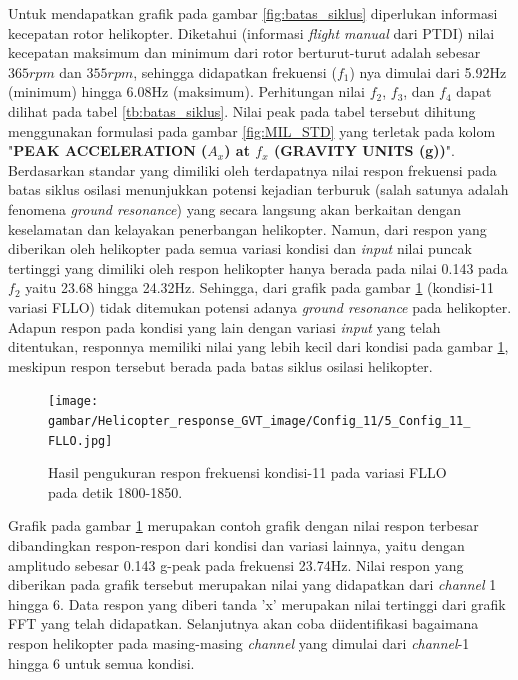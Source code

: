 Untuk mendapatkan grafik pada gambar \ref{fig:batas_siklus} diperlukan informasi kecepatan rotor helikopter. Diketahui (informasi \textit{flight manual} dari PTDI) nilai kecepatan maksimum dan minimum dari rotor berturut-turut adalah sebesar $365 rpm$ dan $355 rpm$, sehingga didapatkan frekuensi ($f_1$) nya dimulai dari 5.92Hz (minimum) hingga 6.08Hz (maksimum). Perhitungan nilai $f_2$, $f_3$, dan $f_4$ dapat dilihat pada tabel \ref{tb:batas_siklus}. Nilai peak pada tabel tersebut dihitung menggunakan formulasi pada gambar \ref{fig:MIL_STD} yang terletak pada kolom "\textbf{PEAK ACCELERATION ($A_x$) at $f_x$ (GRAVITY UNITS (g))}". Berdasarkan standar yang dimiliki oleh \cite{MILSTD} terdapatnya nilai respon frekuensi pada batas siklus osilasi menunjukkan potensi kejadian terburuk (salah satunya adalah fenomena \textit{ground resonance}) yang secara langsung akan berkaitan dengan keselamatan dan kelayakan penerbangan helikopter. Namun, dari respon yang diberikan oleh helikopter pada semua variasi kondisi dan \textit{input} nilai puncak tertinggi yang dimiliki oleh respon helikopter hanya berada pada nilai 0.143 pada $f_2$ yaitu 23.68 hingga 24.32Hz. Sehingga, dari grafik pada gambar \ref{fig:11_FLLO} (kondisi-11 variasi FLLO) tidak ditemukan potensi adanya \textit{ground resonance} pada helikopter. Adapun respon pada kondisi yang lain dengan variasi \textit{input} yang telah ditentukan, responnya memiliki nilai yang lebih kecil dari kondisi pada gambar \ref{fig:11_FLLO}, meskipun respon tersebut berada pada batas siklus osilasi helikopter.

\begin{figure}[h]
	\centering
	\texttt{[image: gambar/Helicopter\_response\_GVT\_image/Config\_11/5\_Config\_11\_FLLO.jpg]}
	\caption{Hasil pengukuran respon frekuensi kondisi-11 pada variasi FLLO pada detik 1800-1850.}
	\label{fig:11_FLLO}
\end{figure}

Grafik pada gambar \ref{fig:11_FLLO} merupakan contoh grafik dengan nilai respon terbesar dibandingkan respon-respon dari kondisi dan variasi lainnya, yaitu dengan amplitudo sebesar 0.143 g-peak pada frekuensi 23.74Hz. Nilai respon yang diberikan pada grafik tersebut merupakan nilai yang didapatkan dari \textit{channel} 1 hingga 6. Data respon yang diberi tanda 'x' merupakan nilai tertinggi dari grafik FFT yang telah didapatkan. Selanjutnya akan coba diidentifikasi bagaimana respon helikopter pada masing-masing \textit{channel} yang dimulai dari \textit{channel}-1 hingga 6 untuk semua kondisi.


